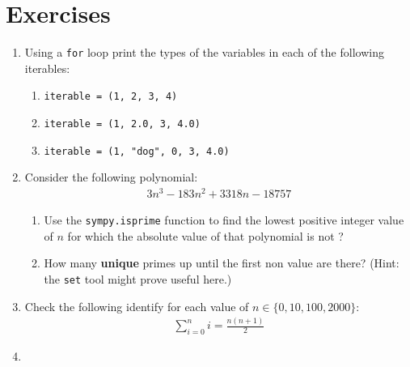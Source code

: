 \section{Exercises}
\begin{enumerate}

\item 

Using a \texttt{for} loop print the types of the variables in each of the following
iterables:
\begin{enumerate}

\item 

\texttt{iterable = (1, 2, 3, 4)}

\item 

\texttt{iterable = (1, 2.0, 3, 4.0)}

\item 

\texttt{iterable = (1, "dog", 0, 3, 4.0)}

\end{enumerate}

\item 

Consider the following polynomial:
\begin{equation*}
\begin{split}
    3 n ^ 3 - 183n ^ 2 + 3318n - 18757
   \end{split}
\end{equation*}\begin{enumerate}

\item 

Use the \texttt{sympy.isprime} function to find the lowest positive integer value
of \(n\) for which the absolute value of that polynomial is not ?

\item 

How many \textbf{unique} primes up until the first non  value are there?
(Hint: the \texttt{set} tool might prove useful here.)

\end{enumerate}

\item 

Check the following identify for each value of \(n\in\{0, 10, 100, 2000\}\):
\begin{equation*}
\begin{split}
       \sum_{i=0}^n i=\frac{n(n+1)}{2}
   \end{split}
\end{equation*}
\item 


\end{enumerate}
